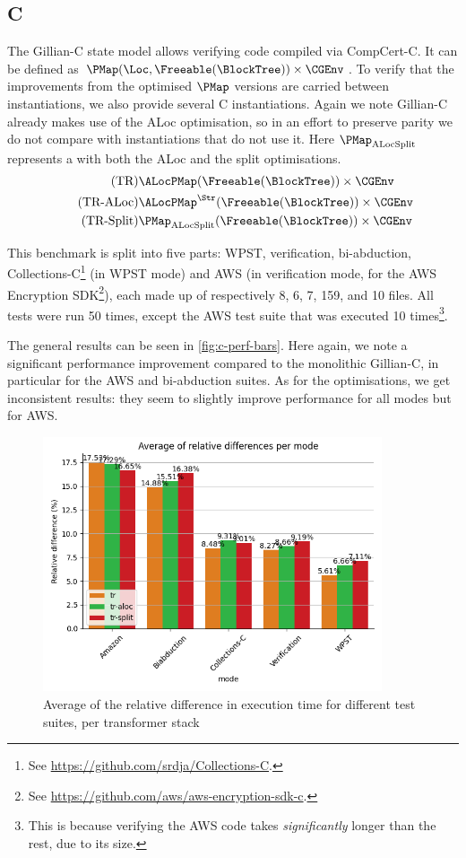 \subsection{C}

The Gillian-C state model allows verifying code compiled via CompCert-C. It can be defined as $\PMap(\Loc,\Freeable(\BlockTree)) \times \CGEnv$. To verify that the improvements from the optimised $\PMap$ versions are carried between instantiations, we also provide several C instantiations. Again we note Gillian-C already makes use of the ALoc optimisation, so in an effort to preserve parity we do not compare with instantiations that do not use it. Here $\PMap_{\text{ALocSplit}}$ represents a \PMap{} with both the ALoc and the split optimisations.
\begin{align}
\tag{TR}       & \ALocPMap(\Freeable(\BlockTree)) \times \CGEnv \\
\tag{TR-ALoc}  & \ALocPMap^\Str(\Freeable(\BlockTree)) \times \CGEnv \\
\tag{TR-Split} & \PMap_{\text{ALocSplit}}(\Freeable(\BlockTree)) \times \CGEnv
\end{align}

This benchmark is split into five parts: WPST, verification, bi-abduction, \mbox{Collections-C}\footnote{See \url{https://github.com/srdja/Collections-C}.} (in WPST mode) and AWS (in verification mode, for the AWS Encryption SDK\footnote{See \url{https://github.com/aws/aws-encryption-sdk-c}.}), each made up of respectively 8, 6, 7, 159, and 10 files. All tests were run 50 times, except the AWS test suite that was executed 10 times\footnote{This is because verifying the AWS code takes \emph{significantly} longer than the rest, due to its size.}.

The general results can be seen in \autoref{fig:c-perf-bars}. Here again, we note a significant performance improvement compared to the monolithic Gillian-C, in particular for the AWS and bi-abduction suites. As for the optimisations, we get inconsistent results: they seem to slightly improve performance for all modes but for AWS. 

\begin{figure}
	\centering
	\includegraphics[width=10cm]{figures/c-perf-bars.png}
	\caption{Average of the relative difference in execution time for different test suites, per transformer stack}
	\label{fig:c-perf-bars}
\end{figure}

